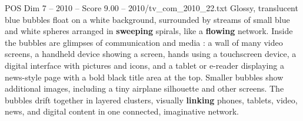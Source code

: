 \begin{textsample}{POS Dim 7 – 2010 – Score 9.00 – 2010/tv\_com\_2010\_22.txt}
Glossy, translucent blue bubbles float on a white background, surrounded by streams of small blue and white spheres arranged in \textbf{sweeping} spirals, like a \textbf{flowing} network.
Inside the bubbles are glimpses of communication and media : a wall of many video screens, a handheld device showing a screen, hands using a touchscreen device, a digital interface with pictures and icons, and a tablet or e-reader displaying a news-style page with a bold black title area at the top.
Smaller bubbles show additional images, including a tiny airplane silhouette and other screens.
The bubbles drift together in layered clusters, visually \textbf{linking} phones, tablets, video, news, and digital content in one connected, imaginative network.

\end{textsample}
